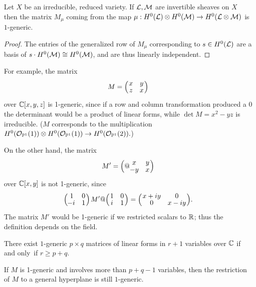 \begin{proposition}\label{some generators}\label{some equations}
Let $X$ be
an irreducible, reduced variety. If $\sL,\sM$ are invertible
sheaves on $X$
then
the matrix $M_\mu$ coming from the map $\mu:H^0(\sL) \otimes H^0(\sM)
\to H^0(\sL\otimes \sM)$
is $1$-generic.
\unif
\end{proposition}

\begin{proof} The entries of the generalized row of $M_\mu$ corresponding
to $s\in H^0(\sL)$
are a basis of $s\cdot H^0(\sM) \cong H^0(\sM)$, and are thus
linearly independent.
\end{proof}

\begin{example}
For example, the matrix
$$
M = \Bigl(\,\begin{matrix}
x &y\\[-2pt]
z&x
\end{matrix}\,
\Bigr)
$$
over $\CC[x,y,z]$ is  1-generic, since if a row and column transformation
produced a 0 the determinant would be a product of linear forms, while
$\det M = x^2-yz$ is irreducible. ($M$ corresponds to the
multiplication
$H^{0}(\sO_{\PP^{1}}(1)) \otimes
H^{0}(\sO_{\PP^{1}}(1))
\to H^{0}(\sO_{\PP^{1}}(2)).
$)

On the other hand, the matrix
$$
M' = \Bigl(@\begin{matrix}
x &y\\[-2pt]
-y&x
\end{matrix}\,\Bigr)
$$
over $\CC[x,y]$ is not 1-generic, since
$$
\Bigl(\,
\begin{matrix}
1&0\\[-2pt]
\!-i&1
\end{matrix}
\,\Bigr)
\,
M'
@
\Bigl(\,
\begin{matrix}
1&0\\[-2pt]
i&1
\end{matrix}
\,\Bigr)
=
\Bigl(\,
\begin{matrix}
x+iy&0\\[-2pt]
0&x-iy
\end{matrix}
\,\Bigr)
.
$$
The matrix $M'$ would be 1-generic if we restricted scalars to
$\RR$; thus the definition depends on the field.
\end{example}

\begin{lemma}\label{existence of 1-generic}\label{variables needed}
\label{size of 1-generic} There exist $1$-generic $p\times q$ matrices of
linear forms in $r+1$ variables over $\CC$ if and only~if $r\geq p+q$.

If $M$ is 1-generic and involves more than $p+q-1$ variables, then the
restriction of $M$ to a general hyperplane is still $1$-generic.
\unif
\end{lemma}

